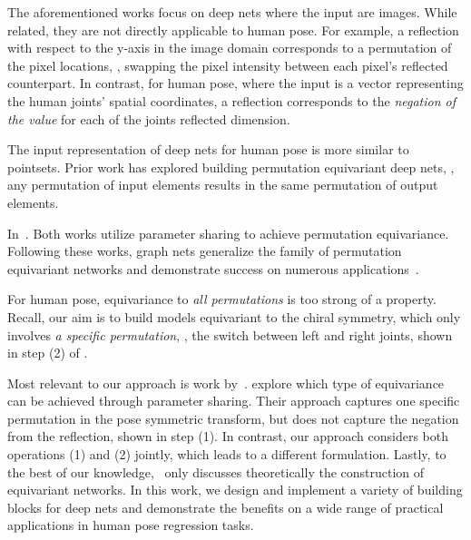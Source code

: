 \documentclass{article}
\begin{document}
The aforementioned works focus on deep nets where the input are images. While related, they are not directly applicable to human pose. For example, a reflection with respect to the y-axis in the image domain corresponds to a permutation of the pixel locations, \ie, swapping the pixel intensity between each pixel's reflected counterpart. In contrast, for human pose, where the input is a vector representing the   human joints' spatial coordinates, a reflection corresponds to the \textit{negation of the value} for each of the joints  reflected dimension. 

The input representation of deep nets for human pose is more similar to pointsets. Prior work has explored building  permutation equivariant deep nets, \ie,  any permutation of input elements  results in the same permutation of output elements.

In~\cite{zaheer2017deep, qi2017pointnet}. Both works utilize parameter sharing to achieve permutation equivariance. Following these works, graph nets generalize the family of permutation equivariant networks and demonstrate success on numerous applications~\cite{scarselli2009graph, kipf2017semi, hamilton2017representation, gilmer2017neural, battaglia2018relational, kipf2018neural, Yeh_2019_CVPR, Liu_2019_CORL}. 

For human pose,  equivariance to \emph{all permutations} is too strong of a property. Recall, our aim is to build models equivariant to the chiral symmetry, which only involves \textit{a specific permutation}, \eg, the switch between left and right joints, shown in step (2) of . 

Most relevant to our approach is work by~\citet{ravanbakhsh2017equivariance}. \citet{ravanbakhsh2017equivariance}  explore which type of equivariance can be achieved through parameter sharing. Their approach captures one specific permutation in the pose symmetric transform, but does not capture the negation from the reflection, shown in  step (1). In contrast, our approach considers both operations (1) and (2) jointly, which leads to a different formulation. Lastly, to the best of our knowledge,~\cite{ravanbakhsh2017equivariance} only discusses theoretically  the construction of equivariant networks. In this work, we design and implement a variety of building blocks for deep nets and demonstrate the benefits on a wide range of practical applications in human pose regression tasks. 
\end{document}
